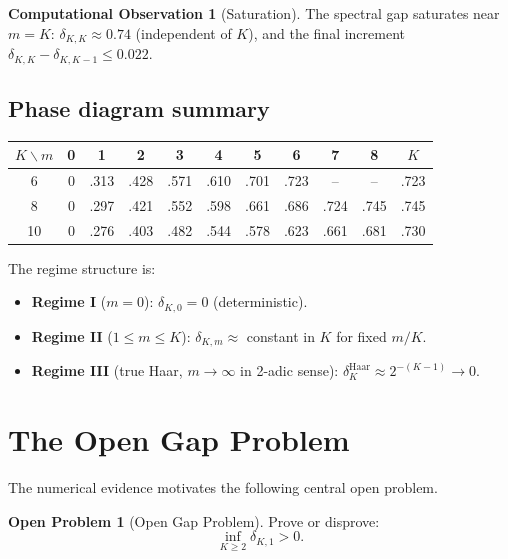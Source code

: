 \documentclass[12pt]{article}
\theoremstyle{definition}
\newtheorem{openproblem}[theorem]{Open Problem}
\newtheorem{observation}[theorem]{Computational Observation}
\begin{document}
\begin{observation}[Saturation]
\label{obs:sat}
The spectral gap saturates near $m = K$:
$\delta_{K,K} \approx 0.74$ (independent of $K$), and the final increment $\delta_{K,K} - \delta_{K,K-1} \leq 0.022$.
\end{observation}

\subsection{Phase diagram summary}

\begin{center}
\begin{tabular}{@{}ccccccccccc@{}}
\toprule
$K \backslash m$ & 0 & 1 & 2 & 3 & 4 & 5 & 6 & 7 & 8 & $K$ \\
\midrule
6  & 0 & .313 & .428 & .571 & .610 & .701 & .723 & -- & -- & .723 \\
8  & 0 & .297 & .421 & .552 & .598 & .661 & .686 & .724 & .745 & .745 \\
10 & 0 & .276 & .403 & .482 & .544 & .578 & .623 & .661 & .681 & .730 \\
\bottomrule
\end{tabular}
\end{center}

The regime structure is:
\begin{itemize}
\item \textbf{Regime I} ($m=0$): $\delta_{K,0} = 0$ (deterministic).
\item \textbf{Regime II} ($1 \leq m \leq K$): $\delta_{K,m} \approx$ constant in $K$ for fixed $m/K$.
\item \textbf{Regime III} (true Haar, $m \to \infty$ in 2-adic sense): $\delta_K^{\mathrm{Haar}} \approx 2^{-(K-1)} \to 0$.
\end{itemize}

\section{The Open Gap Problem}
\label{sec:open}

The numerical evidence motivates the following central open problem.

\begin{openproblem}[Open Gap Problem]
\label{prob:gap}
Prove or disprove:
\[
  \boxed{\inf_{K \geq 2} \delta_{K,1} > 0.}
\]
\end{openproblem}
\end{document}
